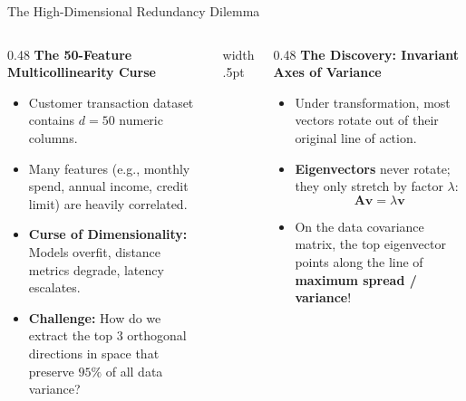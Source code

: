 \documentclass[../m00-session-02.tex]{subfiles}
\begin{document}
\begin{frame}[fragile]{The High-Dimensional Redundancy Dilemma}
  \begin{columns}[T,onlytextwidth]
    \begin{column}{0.48\textwidth}
      {\small\bfseries\color{UpGradRed}The 50-Feature Multicollinearity Curse}\par\vspace{0.08cm}
      \begin{itemize}\setlength{\itemsep}{0.22em}\small
        \item Customer transaction dataset contains $d = 50$ numeric columns.
        \item Many features (e.g., monthly spend, annual income, credit limit) are heavily correlated.
        \item \textcolor{UpGradRed}{\textbf{Curse of Dimensionality:}} Models overfit, distance metrics degrade, latency escalates.
        \item \textbf{Challenge:} How do we extract the top 3 orthogonal directions in space that preserve $95\%$ of all data variance?
      \end{itemize}
    \end{column}
    \hfill{\color{UpGradRule}\vrule width .5pt}\hfill
    \begin{column}{0.48\textwidth}
      {\small\bfseries\color{AWSEmerald}The Discovery: Invariant Axes of Variance}\par\vspace{0.08cm}
      \begin{itemize}\setlength{\itemsep}{0.22em}\small
        \item Under transformation, most vectors rotate out of their original line of action.
        \item \textbf{Eigenvectors} never rotate; they only stretch by factor $\lambda$:
          \[
          \mathbf{A}\mathbf{v} = \lambda\mathbf{v}
          \]
        \item On the data covariance matrix, the top eigenvector points along the line of \textbf{maximum spread / variance}!
      \end{itemize}
      \vspace{0.06cm}
    \end{column}
  \end{columns}
\end{frame}
\end{document}
